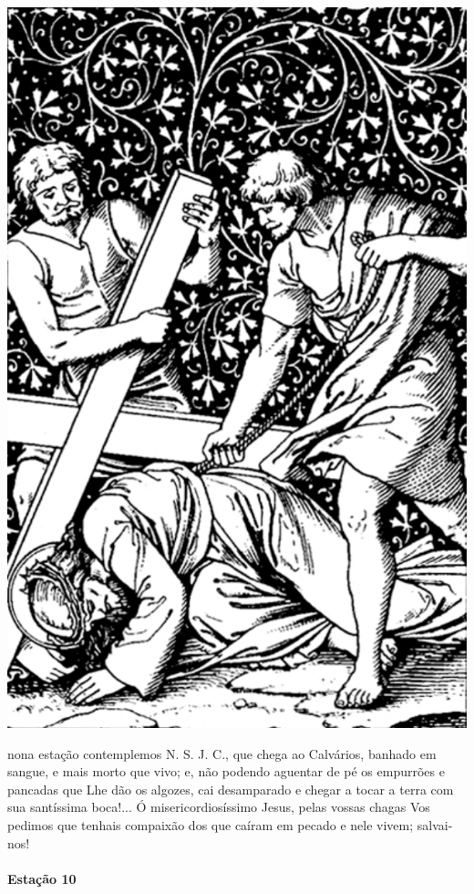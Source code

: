 \begin{nscenter}
\includegraphics[width=.8\textwidth, height=.8\textheight, keepaspectratio]{media/station9}
\end{nscenter}

 nona estação contemplemos N. S. J. C., que chega ao Calvários, banhado em sangue, e mais morto que vivo; e, não podendo aguentar de pé os empurrões e pancadas que Lhe dão os algozes, cai desamparado e chegar a tocar a terra com sua santíssima boca!...
Ó misericordiosíssimo Jesus, pelas vossas chagas Vos pedimos que tenhais compaixão dos que caíram em pecado e nele vivem; salvai-nos!

\newpage

\paragraph{Estação 10}

